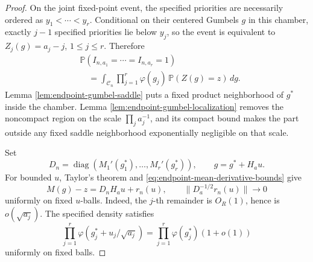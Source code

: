 \documentclass[11pt]{article}
\theoremstyle{remark}
\newcommand{\Pp}{\mathbb P}
\newcommand{\diag}{\operatorname{diag}}
\newcommand{\dd}{\,d}
\begin{document}
\begin{proof}
On the joint fixed-point event, the specified priorities are necessarily
ordered as
\(y_1<\cdots<y_r\).  Conditional on their centered Gumbels \(g\) in this
chamber, exactly \(j-1\) specified priorities lie below \(y_j\), so the event
is equivalent to \(Z_j(g)=a_j-j\), \(1\le j\le r\).  Therefore
\[
\begin{aligned}
&\Pp(I_{n,a_1}=\cdots=I_{n,a_r}=1)\\
&\quad=\int_{\mathscr C_n}
\prod_{j=1}^r\varphi(g_j)\,
\Pp(Z(g)=z)\dd g.
\end{aligned}
\tag{8.35}\label{eq:endpoint-exact-integral}
\]
Lemma \ref{lem:endpoint-gumbel-saddle} puts a fixed product neighborhood of
\(g^*\) inside the chamber.  Lemma
\ref{lem:endpoint-gumbel-localization} removes the noncompact region on the
scale \(\prod_j a_j^{-1}\), and its compact bound makes the part outside any
fixed saddle neighborhood exponentially negligible on that scale.

Set
\[
        D_n=\diag(M_1'(g_1^*),\ldots,M_r'(g_r^*)),
        \qquad g=g^*+H_au.
\]
For bounded \(u\), Taylor's theorem and
\eqref{eq:endpoint-mean-derivative-bounds} give
\[
        M(g)-z=D_nH_au+r_n(u),
        \qquad
        \|D_a^{-1/2}r_n(u)\|\longrightarrow0
\tag{8.36}\label{eq:endpoint-mean-stability}
\]
uniformly on fixed \(u\)-balls.  Indeed, the \(j\)-th remainder is
\(O_R(1)\), hence is \(o(\sqrt{a_j})\).  The specified density satisfies
\[
        \prod_{j=1}^r\varphi(g_j^*+u_j/\sqrt{a_j})
        =\prod_{j=1}^r\varphi(g_j^*)(1+o(1))
\tag{8.37}\label{eq:endpoint-density-stability}
\]
uniformly on fixed balls.


\end{proof}
\end{document}
